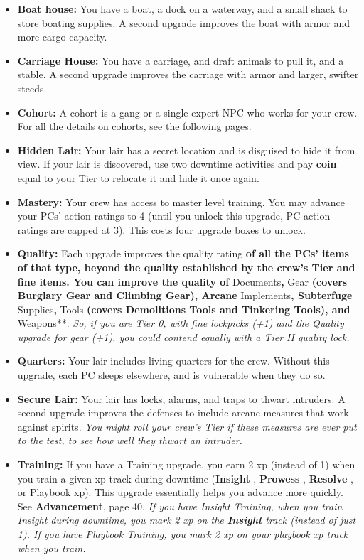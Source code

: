 \documentclass[11pt,oneside]{book}
\newcommand{\gameterm}[1]{\textbf{#1}}
\begin{document}
\begin{itemize}
	\item \gameterm{Boat house:} You have a boat, a dock on a waterway, and a small shack to store boating supplies. A second upgrade improves the boat with armor and more cargo capacity.
	\item \gameterm{Carriage House:}  You have a carriage, and draft animals to pull it, and a stable. A second upgrade improves the carriage with armor and larger, swifter steeds.
	\item \gameterm{Cohort:}  A cohort is a gang or a single expert NPC who works for your crew. For all the details on cohorts, see the following pages.
	\item \gameterm{Hidden Lair:}  Your lair has a secret location and is disguised to hide it from view. If your lair is discovered, use two downtime activities and pay \gameterm{coin}  equal to your Tier to relocate it and hide it once again.
	\item \gameterm{Mastery: } Your crew has access to master level training. You may advance your PCs’ action ratings to 4 (until you unlock this upgrade, PC action ratings are capped at 3). This costs four upgrade boxes to unlock.
	\item \gameterm{Quality:} \textbf{ }Each upgrade improves the quality rating\textbf{ of all the PCs’ items of that type, beyond the quality established by the crew’s Tier and fine items. You can improve the quality of }Documents\textbf{, }Gear\textbf{ (covers Burglary Gear and Climbing Gear), Arcane }Implements\textbf{, Subterfuge }Supplies\textbf{, }Tools\textbf{ (covers Demolitions Tools and Tinkering Tools), and }Weapons**. \emph{So, if you are Tier 0, with fine lockpicks (+1) and the Quality upgrade for gear (+1), you could contend equally with a Tier II quality lock.}
	\item \gameterm{Quarters:}  Your lair includes living quarters for the crew. Without this upgrade, each PC sleeps elsewhere, and is vulnerable when they do so.
	\item \gameterm{Secure Lair:} Your lair has locks, alarms, and traps to thwart intruders. A second upgrade improves the defenses to include arcane measures that work against spirits. \emph{You might roll your crew’s Tier if these measures are ever put to the test, to see how well they thwart an intruder.}
	\item \gameterm{Training: } If you have a Training upgrade, you earn 2 xp (instead of 1) when you train a given xp track during downtime (\gameterm{Insight} , \gameterm{Prowess} , \gameterm{Resolve} , or Playbook xp). This upgrade essentially helps you advance more quickly. See \textbf{Advancement}, page 40. \emph{If you have Insight Training, when you train Insight during downtime, you mark 2 xp on the \gameterm{Insight}  track (instead of just 1). If you have Playbook Training, you mark 2 xp on your playbook xp track when you train.}

\end{itemize}
\end{document}
